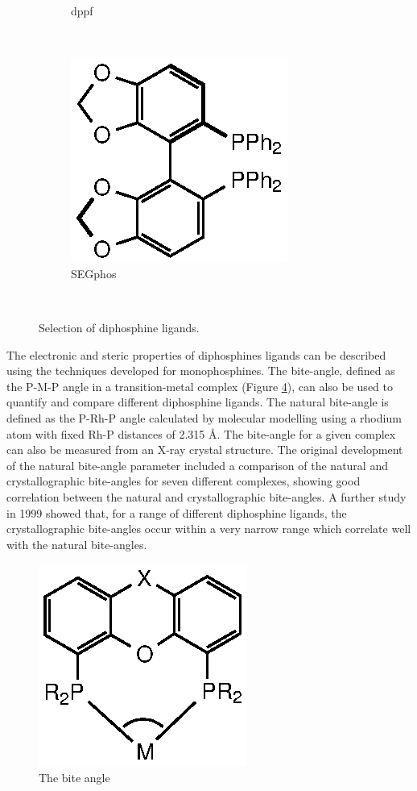 \begin{figure}[htbp]
\begin{subfigure}[b]{0.3\textwidth}
	\caption{dppf}
	\label{dppf}
\end{subfigure}
~
\begin{subfigure}[b]{0.3\textwidth}
	\centering
	\includegraphics{../Figures/Diphosphines/SEGphos.eps}
	\caption{SEGphos}
	\label{SEGphos}
\end{subfigure}
\\
\caption[Selection of diphosphine ligands]{Selection of diphosphine ligands.}
\label{diphosphineligands}
\end{figure}

The electronic and steric properties of diphosphines ligands can be described using the techniques developed for monophosphines.\cite{Tolman1977, Banger2009, Dunne1991, Roodt2003, Mann1980, Tiburcio2006, Tolman1970}  The bite-angle, defined as the P-M-P angle in a transition-metal complex (Figure \ref{Biteangle}), can also be used to quantify and compare different diphosphine ligands.  The natural bite-angle is defined as the P-Rh-P angle calculated by molecular modelling using a rhodium atom with fixed Rh-P distances of 2.315 \si{\angstrom}.\cite{Casey1990}  The bite-angle for a given complex can also be measured from an X-ray crystal structure.  The original development of the natural bite-angle parameter included a comparison of the natural and crystallographic bite-angles for seven different complexes, showing good correlation between the natural and crystallographic bite-angles.\cite{Casey1990}  A further study in 1999 showed that, for a range of different diphosphine ligands, the crystallographic bite-angles occur within a very narrow range which correlate well with the natural bite-angles.\cite{Dierkes1999}

\begin{figure}[ht]
\centering
\includegraphics[]{../Figures/Biteangle.eps}
\caption[The bite angle]{The bite angle}
\label{Biteangle}
\end{figure}

